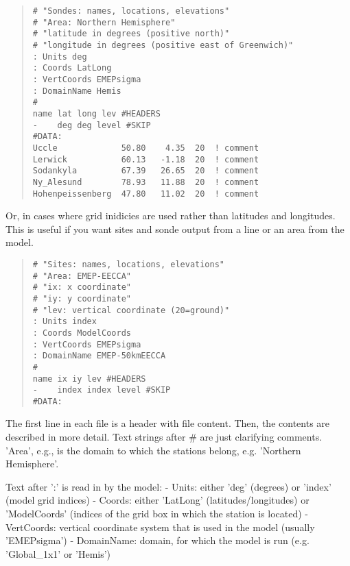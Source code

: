 \begin{small}
\begin{quote}
\begin{verbatim}
# "Sondes: names, locations, elevations"
# "Area: Northern Hemisphere"
# "latitude in degrees (positive north)"
# "longitude in degrees (positive east of Greenwich)"
: Units deg
: Coords LatLong
: VertCoords EMEPsigma
: DomainName Hemis
#
name lat long lev #HEADERS
-    deg deg level #SKIP
#DATA:
Uccle             50.80    4.35  20  ! comment
Lerwick           60.13   -1.18  20  ! comment
Sodankyla         67.39   26.65  20  ! comment
Ny_Alesund        78.93   11.88  20  ! comment
Hohenpeissenberg  47.80   11.02  20  ! comment
\end{verbatim}

\end{quote}
\end{small}

Or, in cases where grid inidicies are used rather than latitudes and 
longitudes. This is useful if you want sites and sonde output from a line 
or an area from the model. 

\begin{small}
\begin{quote}
\begin{verbatim}
# "Sites: names, locations, elevations"
# "Area: EMEP-EECCA"
# "ix: x coordinate"
# "iy: y coordinate"
# "lev: vertical coordinate (20=ground)"
: Units index
: Coords ModelCoords
: VertCoords EMEPsigma
: DomainName EMEP-50kmEECCA
#
name ix iy lev #HEADERS
-    index index level #SKIP
#DATA:

\end{verbatim}

\end{quote}
\end{small}

The first line in each file is a header with file content.
Then, the contents are described in more detail. Text strings after
\# are just clarifying comments. 'Area', e.g., is the domain to which
the stations belong, e.g. 'Northern Hemisphere'.

Text after ':' is read in by the model:\newline
- Units: either 'deg' (degrees) or 'index' (model grid indices)\newline
- Coords: either 'LatLong' (latitudes/longitudes) or 'ModelCoords'
(indices of the grid box in which the station is located)\newline
- VertCoords: vertical coordinate system that is used in the model (usually
'EMEPsigma')\newline
- DomainName: domain, for which the model is run (e.g. 'Global\_1x1' or 'Hemis')\newline


